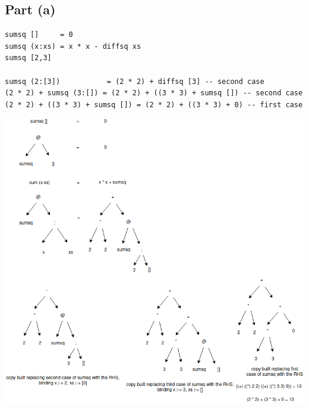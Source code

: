 \documentclass[11pt]{article}
\begin{document}
\subsection{Part (a)}
\label{sec:org3c437bc}
\begin{verbatim}
sumsq []     = 0
sumsq (x:xs) = x * x - diffsq xs
sumsq [2,3]

sumsq (2:[3])           = (2 * 2) + diffsq [3] -- second case
(2 * 2) + sumsq (3:[]) = (2 * 2) + ((3 * 3) + sumsq []) -- second case
(2 * 2) + ((3 * 3) + sumsq []) = (2 * 2) + ((3 * 3) + 0) -- first case
\end{verbatim}
\begin{center}
\includegraphics[width=160mm]{./sumsq-xs.png}
\end{center}
\end{document}
